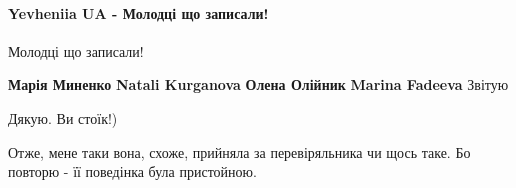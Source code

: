  
 
 
 
 

\paragraph{Yevheniia UA - Молодці що записали!}
\label{sec:24_07_2021.fb.hvylja_oksana.1.uvolnenie_harkov_kiosk.cmt.yevhenia_ua_molodcy}

\begin{itemize}
 
Молодці що записали!

 
\textbf{Марія Миненко} \textbf{Natali Kurganova} \textbf{Олена Олійник} \textbf{Marina Fadeeva}
Звітую


\begin{itemize}
 
Дякую. Ви стоїк!)

 
Отже, мене таки вона, схоже, прийняла за перевіряльника чи щось таке. Бо повторю - її поведінка була пристойною.
\end{itemize}


\end{itemize}

